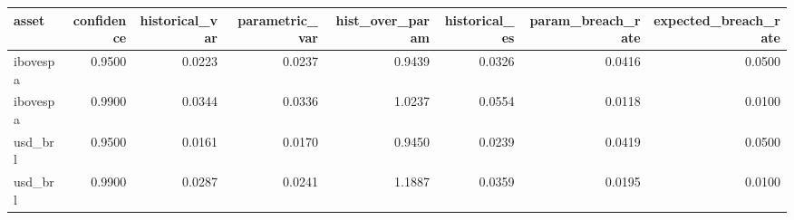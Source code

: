 \begin{tabular}{lrrrrrrr}
\toprule
asset & confidence & historical_var & parametric_var & hist_over_param & historical_es & param_breach_rate & expected_breach_rate \\
\midrule
ibovespa & 0.9500 & 0.0223 & 0.0237 & 0.9439 & 0.0326 & 0.0416 & 0.0500 \\
ibovespa & 0.9900 & 0.0344 & 0.0336 & 1.0237 & 0.0554 & 0.0118 & 0.0100 \\
usd_brl & 0.9500 & 0.0161 & 0.0170 & 0.9450 & 0.0239 & 0.0419 & 0.0500 \\
usd_brl & 0.9900 & 0.0287 & 0.0241 & 1.1887 & 0.0359 & 0.0195 & 0.0100 \\
\bottomrule
\end{tabular}
